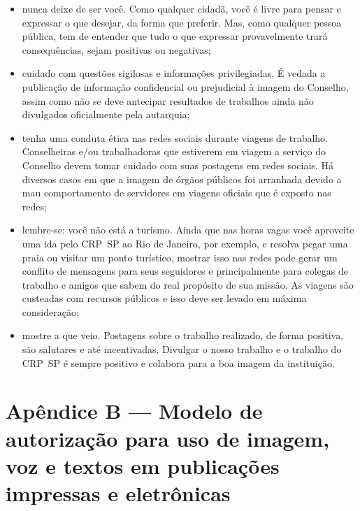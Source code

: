 \begin{itemize}
        por uma trabalhadora e prejudicando o órgão nunca tem somente a
        instituição como alvo único, e pode acabar causando danos de imagem
        também a suas funcionárias.
  \item
        nunca deixe de ser você. Como qualquer cidadã, você é livre para
        pensar e expressar o que desejar, da forma que preferir. Mas, como
        qualquer pessoa pública, tem de entender que tudo o que expressar
        provavelmente trará consequências, sejam positivas ou negativas;
  \item
        cuidado com questões sigilosas e informações privilegiadas. É vedada a
        publicação de informação confidencial ou prejudicial à imagem do
        Conselho, assim como não se deve antecipar resultados de trabalhos
        ainda não divulgados oficialmente pela autarquia;
  \item
        tenha uma conduta ética nas redes sociais durante viagens de trabalho.
        Conselheiras e/ou trabalhadoras que estiverem em viagem a serviço do
        Conselho devem tomar cuidado com suas postagens em redes sociais. Há
        diversos casos em que a imagem de órgãos públicos foi arranhada devido
        a mau comportamento de servidores em viagens oficiais que é exposto
        nas redes;
  \item
        lembre-se: você não está a turismo. Ainda que nas horas vagas você
        aproveite uma ida pelo CRP~SP ao Rio de Janeiro, por exemplo, e
        resolva pegar uma praia ou visitar um ponto turístico, mostrar isso
        nas redes pode gerar um conflito de mensagens para seus seguidores e
        principalmente para colegas de trabalho e amigos que sabem do real
        propósito de sua missão. As viagens são custeadas com recursos
        públicos e isso deve ser levado em máxima consideração;
  \item
        mostre a que veio. Postagens sobre o trabalho realizado, de forma
        positiva, são salutares e até incentivadas. Divulgar o nosso trabalho
        e o trabalho do CRP~SP é sempre positivo e colabora para a boa imagem
        da instituição.
\end{itemize}

\chapter{Apêndice B --- Modelo de autorização para uso de imagem, voz e
  textos em publicações impressas e
  eletrônicas}


